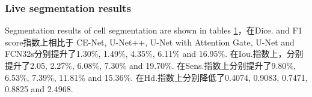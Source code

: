 \documentclass[UTF8]{article} %
\begin{document}
\subsubsection{Live segmentation results}
Segmentation results of cell segmentation are shown in tables \ref{dataset-table}，在Dice. and F1 score指数上相比于
CE-Net, U-Net++, U-Net with Attention Gate, U-Net and FCN32s分别提升了1.30\(\%\), 1.49\(\%\), 4.35\(\%\), 6.11\(\%\) and 16.95\(\%\).
在Iou.指数上，分别提升了2.05, 2.27\(\%\), 6.08\(\%\), 7.30\(\%\) and 19.70\(\%\). 在Sens.指数上分别提升了9.80\(\%\), 6.53\(\%\), 7.39\(\%\), 
11.81\(\%\) and 15.36\(\%\). 在Hd.指数上分别降低了0.4074, 0.9083, 0.7471, 0.8825 and 2.4968.
  \begin{table}[htbp]
    \vspace{-2mm}
    \begin{center}\small
    \label{dataset-table}
    \begin{tabular}{cccccccc}
      

\end{tabular}
\end{center}
\end{table}
\end{document}
